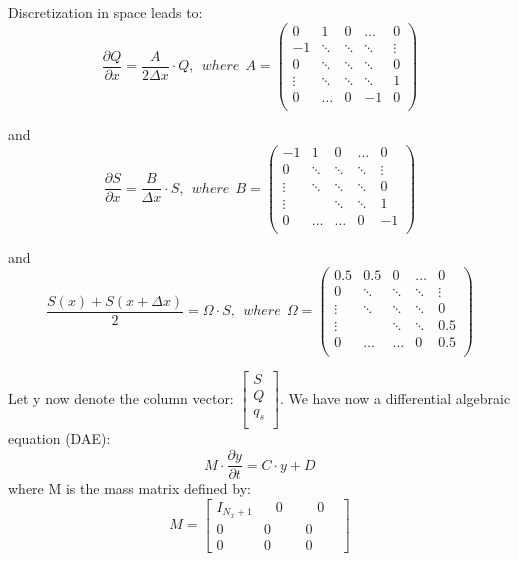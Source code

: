 \documentclass[
journal=jacsat, %
manuscript=article]{achemso}
\begin{document}
Discretization in space leads to:
\begin{equation}
    \frac{\partial Q}{\partial x}=\frac{A}{2 \Delta x}\cdot Q, \: \: where \: \:  A=
    \begin{pmatrix}
    0 & 1 & 0 & \ldots & 0 \\
    -1 & \ddots & \ddots & \ddots & \vdots \\
    0 & \ddots & \ddots & \ddots & 0 \\
    \vdots & \ddots & \ddots & \ddots & 1 \\
    0 & \ldots & 0 & -1 & 0 \\
    \end{pmatrix}
\end{equation}

and 
\begin{equation}
    \frac{\partial S}{\partial x}=\frac{B}{\Delta x}\cdot S, \: \: where \: \:  B=
    \begin{pmatrix}
    -1 & 1 & 0 & \ldots & 0 \\
    0 & \ddots & \ddots & \ddots & \vdots \\
    \vdots & \ddots & \ddots & \ddots & 0 \\
    \vdots &  & \ddots & \ddots & 1 \\
    0 & \ldots & \ldots & 0 & -1 \\
    \end{pmatrix}
\end{equation}

and 
\begin{equation}
    \frac{S(x)+S(x+\Delta x)}{2}=\Omega \cdot S, \: \: where \: \:  \Omega=
    \begin{pmatrix}
    0.5 & 0.5 & 0 & \ldots & 0 \\
    0 & \ddots & \ddots & \ddots & \vdots \\
    \vdots & \ddots & \ddots & \ddots & 0 \\
    \vdots &  & \ddots & \ddots & 0.5 \\
    0 & \ldots & \ldots & 0 & 0.5 \\
    \end{pmatrix}
\end{equation}


Let y now denote the column vector: $\begin{bmatrix}
    S \\
    Q \\
    q_{s} \\
\end{bmatrix}$. We have now a differential algebraic equation (DAE):
\begin{equation}
    M \cdot \frac{\partial y}{\partial t}=C \cdot y + D
\end{equation} where M is the mass matrix defined by:
\begin{equation}
M=
\left[
\begin{array}{c|c|c}
I_{N_{x}+1} & \; \; \; 0 \; \; \;  &\; \;  \; 0\;   \; \;  \\
\hline
0 & 0 & 0 \\
\hline
0 & 0 & 0
\end{array}
\right]
\end{equation}
\end{document}
